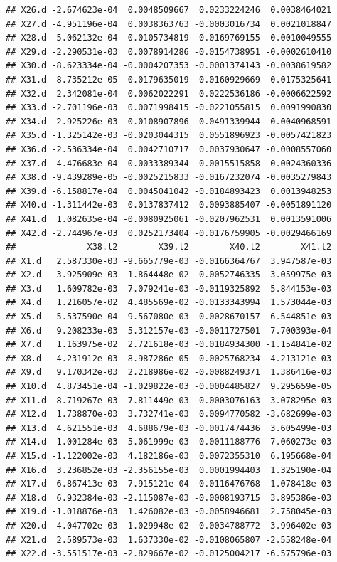 \documentclass[]{article}
\begin{document}
\begin{verbatim}
## X26.d -2.674623e-04  0.0048509667  0.0233224246  0.0038464021
## X27.d -4.951196e-04  0.0038363763 -0.0003016734  0.0021018847
## X28.d -5.062132e-04  0.0105734819 -0.0169769155  0.0010049555
## X29.d -2.290531e-03  0.0078914286 -0.0154738951 -0.0002610410
## X30.d -8.623334e-04 -0.0004207353 -0.0001374143 -0.0038619582
## X31.d -8.735212e-05 -0.0179635019  0.0160929669 -0.0175325641
## X32.d  2.342081e-04  0.0062022291  0.0222536186 -0.0006622592
## X33.d -2.701196e-03  0.0071998415 -0.0221055815  0.0091990830
## X34.d -2.925226e-03 -0.0108907896  0.0491339944 -0.0040968591
## X35.d -1.325142e-03 -0.0203044315  0.0551896923 -0.0057421823
## X36.d -2.536334e-04  0.0042710717  0.0037930647 -0.0008557060
## X37.d -4.476683e-04  0.0033389344 -0.0015515858  0.0024360336
## X38.d -9.439289e-05 -0.0025215833 -0.0167232074 -0.0035279843
## X39.d -6.158817e-04  0.0045041042 -0.0184893423  0.0013948253
## X40.d -1.311442e-03  0.0137837412  0.0093885407 -0.0051891120
## X41.d  1.082635e-04 -0.0080925061 -0.0207962531  0.0013591006
## X42.d -2.744967e-03  0.0252173404 -0.0176759905 -0.0029466169
##              X38.l2        X39.l2        X40.l2        X41.l2
## X1.d   2.587330e-03 -9.665779e-03 -0.0166364767  3.947587e-03
## X2.d   3.925909e-03 -1.864448e-02 -0.0052746335  3.059975e-03
## X3.d   1.609782e-03  7.079241e-03 -0.0119325892  5.844153e-03
## X4.d   1.216057e-02  4.485569e-02 -0.0133343994  1.573044e-03
## X5.d   5.537590e-04  9.567080e-03 -0.0028670157  6.544851e-03
## X6.d   9.208233e-03  5.312157e-03 -0.0011727501  7.700393e-04
## X7.d   1.163975e-02  2.721618e-03 -0.0184934300 -1.154841e-02
## X8.d   4.231912e-03 -8.987286e-05 -0.0025768234  4.213121e-03
## X9.d   9.170342e-03  2.218986e-02 -0.0088249371  1.386416e-03
## X10.d  4.873451e-04 -1.029822e-03 -0.0004485827  9.295659e-05
## X11.d  8.719267e-03 -7.811449e-03  0.0003076163  3.078295e-03
## X12.d  1.738870e-03  3.732741e-03  0.0094770582 -3.682699e-03
## X13.d  4.621551e-03  4.688679e-03 -0.0017474436  3.605499e-03
## X14.d  1.001284e-03  5.061999e-03 -0.0011188776  7.060273e-03
## X15.d -1.122002e-03  4.182186e-03  0.0072355310  6.195668e-04
## X16.d  3.236852e-03 -2.356155e-03  0.0001994403  1.325190e-04
## X17.d  6.867413e-03  7.915121e-04 -0.0116476768  1.078418e-03
## X18.d  6.932384e-03 -2.115087e-03 -0.0008193715  3.895386e-03
## X19.d -1.018876e-03  1.426082e-03 -0.0058946681  2.758045e-03
## X20.d  4.047702e-03  1.029948e-02 -0.0034788772  3.996402e-03
## X21.d  2.589573e-03  1.637330e-02 -0.0108065807 -2.558248e-04
## X22.d -3.551517e-03 -2.829667e-02 -0.0125004217 -6.575796e-03

\end{verbatim}
\end{document}
